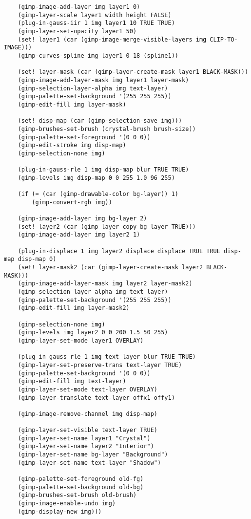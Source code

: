 \documentclass{article}
\begin{document}
{\begin{verbatim}
    (gimp-image-add-layer img layer1 0)
    (gimp-layer-scale layer1 width height FALSE)
    (plug-in-gauss-iir 1 img layer1 10 TRUE TRUE)
    (gimp-layer-set-opacity layer1 50)
    (set! layer1 (car (gimp-image-merge-visible-layers img CLIP-TO-IMAGE)))
    (gimp-curves-spline img layer1 0 18 (spline1))

    (set! layer-mask (car (gimp-layer-create-mask layer1 BLACK-MASK)))
    (gimp-image-add-layer-mask img layer1 layer-mask)
    (gimp-selection-layer-alpha img text-layer)
    (gimp-palette-set-background '(255 255 255))
    (gimp-edit-fill img layer-mask)

    (set! disp-map (car (gimp-selection-save img)))
    (gimp-brushes-set-brush (crystal-brush brush-size))
    (gimp-palette-set-foreground '(0 0 0))
    (gimp-edit-stroke img disp-map)
    (gimp-selection-none img)

    (plug-in-gauss-rle 1 img disp-map blur TRUE TRUE)
    (gimp-levels img disp-map 0 0 255 1.0 96 255)

    (if (= (car (gimp-drawable-color bg-layer)) 1)
        (gimp-convert-rgb img))

    (gimp-image-add-layer img bg-layer 2)
    (set! layer2 (car (gimp-layer-copy bg-layer TRUE)))
    (gimp-image-add-layer img layer2 1)

    (plug-in-displace 1 img layer2 displace displace TRUE TRUE disp-map disp-map 0)
    (set! layer-mask2 (car (gimp-layer-create-mask layer2 BLACK-MASK)))
    (gimp-image-add-layer-mask img layer2 layer-mask2)
    (gimp-selection-layer-alpha img text-layer)
    (gimp-palette-set-background '(255 255 255))
    (gimp-edit-fill img layer-mask2)

    (gimp-selection-none img)
    (gimp-levels img layer2 0 0 200 1.5 50 255)
    (gimp-layer-set-mode layer1 OVERLAY)

    (plug-in-gauss-rle 1 img text-layer blur TRUE TRUE)
    (gimp-layer-set-preserve-trans text-layer TRUE)
    (gimp-palette-set-background '(0 0 0))
    (gimp-edit-fill img text-layer)
    (gimp-layer-set-mode text-layer OVERLAY)
    (gimp-layer-translate text-layer offx1 offy1)

    (gimp-image-remove-channel img disp-map)

    (gimp-layer-set-visible text-layer TRUE)
    (gimp-layer-set-name layer1 "Crystal")
    (gimp-layer-set-name layer2 "Interior")
    (gimp-layer-set-name bg-layer "Background")
    (gimp-layer-set-name text-layer "Shadow")

    (gimp-palette-set-foreground old-fg)
    (gimp-palette-set-background old-bg)
    (gimp-brushes-set-brush old-brush)
    (gimp-image-enable-undo img)
    (gimp-display-new img)))
\end{verbatim}}
\twocolumn
\end{document}
